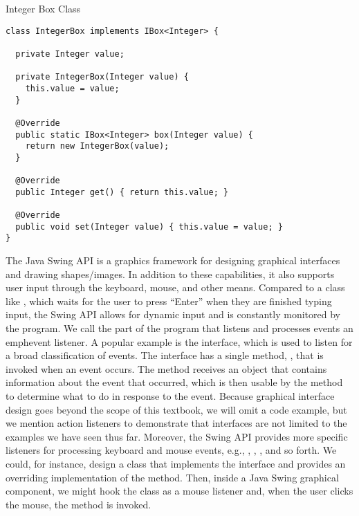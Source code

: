 \begin{cl}[]{Integer Box Class}
\begin{lstlisting}[language=MyJava]
class IntegerBox implements IBox<Integer> {
  
  private Integer value;
  
  private IntegerBox(Integer value) { 
    this.value = value; 
  }
  
  @Override
  public static IBox<Integer> box(Integer value) { 
    return new IntegerBox(value); 
  }
  
  @Override
  public Integer get() { return this.value; }
  
  @Override
  public void set(Integer value) { this.value = value; }
}
\end{lstlisting}
\end{cl}

The Java Swing API is a graphics framework for designing graphical interfaces and drawing shapes/images. In addition to these capabilities, it also supports user input through the keyboard, mouse, and other means. Compared to a class like , which waits for the user to press ``Enter'' when they are finished typing input, the Swing API allows for dynamic input and is constantly monitored by the program. We call the part of the program that listens and processes events an emph{event listener}. A popular example is the  interface, which is used to listen for a broad classification of events. The  interface has a single method, , that is invoked when an event occurs. The  method receives an  object that contains information about the event that occurred, which is then usable by the method to determine what to do in response to the event. Because graphical interface design goes beyond the scope of this textbook, we will omit a code example, but we mention action listeners to demonstrate that interfaces are not limited to the examples we have seen thus far. Moreover, the Swing API provides more specific listeners for processing keyboard and mouse events, e.g., , , , and so forth. We could, for instance, design a class that implements the  interface and provides an overriding implementation of the  method. Then, inside a Java Swing graphical component, we might hook the class as a mouse listener and, when the user clicks the mouse, the  method is invoked.

